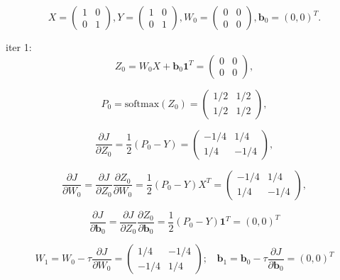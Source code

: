 \documentclass[12pt]{article}
\begin{document}
\begin{equation*}
X = \left(                        
\begin{matrix}
1 & 0 \\
0 & 1
\end{matrix}
\right), 
Y = \left(                        
\begin{matrix}
1 & 0 \\
0 & 1
\end{matrix}
\right), 
W_0 =  \left(                        
\begin{matrix}
0 & 0 \\
0 & 0
\end{matrix}
\right), 
\pmb{b}_0 = (0,0)^T.
\end{equation*}

iter 1:
$$Z_0 = W_0 X  + \pmb{b}_0 \pmb{1}^T = \left(                        
\begin{matrix}
0 & 0 \\
0 & 0
\end{matrix}
\right), 
$$

$$
P_0 = \mathrm{softmax}(Z_0) = \left(                        
\begin{matrix}
1/2 & 1/2 \\
1/2 & 1/2
\end{matrix}
\right), 
$$

$$
\frac{\partial J}{\partial Z_0} = \frac{1}{2} (P_0 - Y) =  \left(                        
\begin{matrix}
-1/4 & 1/4 \\
1/4 & -1/4
\end{matrix}
\right), 
$$

$$
\frac{\partial J}{\partial W_0} = \frac{\partial J}{\partial Z_0} \frac{\partial Z_0}{\partial W_0} = \frac{1}{2} (P_0 - Y) X^T = \left(                        
\begin{matrix}
-1/4 & 1/4 \\
1/4 & -1/4
\end{matrix}
\right), 
$$

$$
\frac{\partial J}{\partial \pmb{b}_0} = \frac{\partial J}{\partial Z_0} \frac{\partial Z_0}{\partial \pmb{b}_0} = \frac{1}{2} (P_0 - Y) \pmb{1}^T = (0,0)^T
$$

$$
W_1 = W_0 - \tau \frac{\partial J}{\partial W_0} = \left(                        
\begin{matrix}
1/4 & -1/4 \\
-1/4 & 1/4
\end{matrix}
\right); \  \ \ \
\pmb{b}_1 = \pmb{b}_0 - \tau \frac{\partial J}{\partial \pmb{b}_0} =  (0,0)^T
$$
\end{document}
